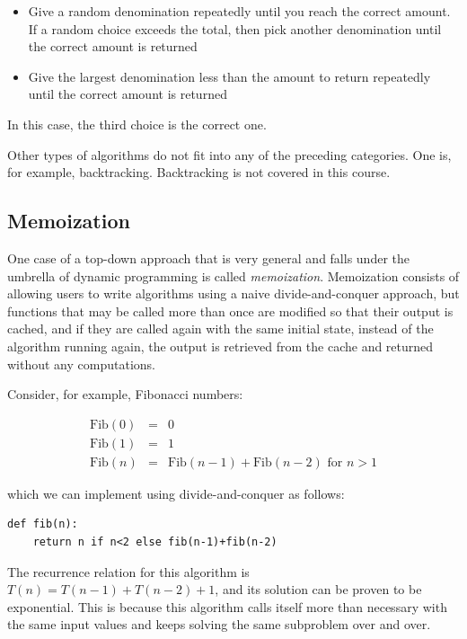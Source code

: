 \documentclass[justified,sixbynine]{tufte-book}
\theoremstyle{plain}%
\theoremstyle{definition}
\theoremstyle{remark}
\begin{document}
\begin{fullwidth}
\begin{itemize}
\item Give a random denomination repeatedly until you reach the correct amount. If a random choice exceeds the total, then pick another denomination until the correct amount is returned

\item Give the largest denomination less than the amount to return repeatedly until the correct amount is returned
\end{itemize}

In this case, the third choice is the correct one.

Other types of algorithms do not fit into any of the preceding
categories. One is, for example, backtracking. Backtracking is not covered
in this course.

\goodbreak\subsection{Memoization}


One case of a top-down approach that is very general and falls under the umbrella of dynamic programming is called {\it memoization}. Memoization consists of allowing users to write algorithms using a naive divide-and-conquer approach, but functions that may be called more than once are modified so that their output is cached, and if they are called again with the same initial state, instead of the algorithm running again, the output is retrieved from the cache and returned without any computations.


Consider, for example, Fibonacci numbers:

\begin{eqnarray}
\textrm{Fib}(0)&=&0\\
\textrm{Fib}(1)&=&1\\
\textrm{Fib}(n)&=&\textrm{Fib}(n-1)+\textrm{Fib}(n-2)\textrm{ for }n>1
\end{eqnarray}

which we can implement using divide-and-conquer as follows:

\begin{lstlisting}
def fib(n):
    return n if n<2 else fib(n-1)+fib(n-2)
\end{lstlisting}

The recurrence relation for this algorithm is $T(n)=T(n-1)+T(n-2)+1$, and its solution can be proven to be exponential. This is because this algorithm calls itself more than necessary with the same input values and keeps solving the same subproblem over and over.


\end{fullwidth}
\end{document}
